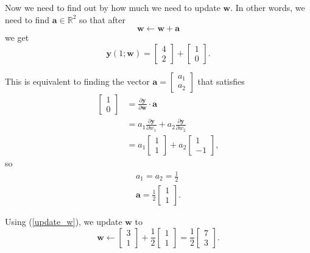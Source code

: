 \documentclass{article}
\let\vec\mathbf
\begin{document}
Now we need to find out by how much we need to update $\vec{w}$. In other words, we need to find $\vec{a} \in \mathbb{R}^2$ so that after
\begin{equation}
    \label{update_w}
    \vec{w} \leftarrow \vec{w} + \vec{a}
\end{equation}
we get
\begin{equation*}
    \vec{y}(1; \vec{w}) =
    \begin{bmatrix}
        4 \\
        2
    \end{bmatrix} + 
    \begin{bmatrix}
        1 \\
        0
    \end{bmatrix}.
\end{equation*}

This is equivalent to finding the vector $\vec{a} = \begin{bmatrix} a_1 \\ a_2 \end{bmatrix}$ that satisfies
\begin{align*}
    \begin{bmatrix}
        1 \\
        0
    \end{bmatrix}
    &=
    \frac{\partial \vec{y}}{\partial \vec{w}} \cdot \vec{a}
    \\
    &=
    a_1
    \frac{\partial \vec{y}}{\partial w_1}
    +
    a_2
    \frac{\partial \vec{y}}{\partial w_2}
    \\
    &=
    a_1
    \begin{bmatrix}
        1 \\
        1
    \end{bmatrix}
    +
    a_2
    \begin{bmatrix}
        1 \\
        -1
    \end{bmatrix},
\end{align*}
so
\begin{align*}
    a_1 = a_2 = \frac{1}{2} \\
    \vec{a} =
    \frac{1}{2}
    \begin{bmatrix}
        1 \\
        1
    \end{bmatrix}.
\end{align*}

Using (\ref{update_w}), we update $\vec{w}$ to
\begin{equation*}
    \vec{w}
    \leftarrow
    \begin{bmatrix}
        3 \\
        1
    \end{bmatrix}
    +
    \frac{1}{2}
    \begin{bmatrix}
        1 \\
        1
    \end{bmatrix}
    =
    \frac{1}{2}
    \begin{bmatrix}
        7 \\
        3
    \end{bmatrix}.
\end{equation*}
\end{document}
